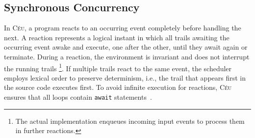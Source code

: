 \documentclass{sigplanconf}
\newcommand{\CEU}{\textsc{C\'{e}u}\xspace}
\newcommand{\code}[1] {{\small{\texttt{#1}}}}
\newcommand{\1}{\;}
\newcommand{\2}{\;\;}
\newcommand{\3}{\;\;\;}
\newcommand{\5}{\;\;\;\;\;}
\begin{document}

\subsection{Synchronous Concurrency}
\label{sec.ceu.sync}

In \CEU, a program reacts to an occurring event completely before handling the 
next.
%
A reaction represents a logical instant in which all trails awaiting the 
occurring event awake and execute, one after the other, until they await again 
or terminate.
%
During a reaction, the environment is invariant and does not interrupt the 
running trails%
\footnote{
The actual implementation enqueues incoming input events to process them in 
further reactions.
}.
If multiple trails react to the same event, the scheduler employs lexical order 
to preserve determinism, i.e., the trail that appears first in the source code 
executes first.
%
To avoid infinite execution for reactions, \CEU ensures that all loops contain 
\code{await} statements~\cite{ceu.sensys13}.
\end{document}
